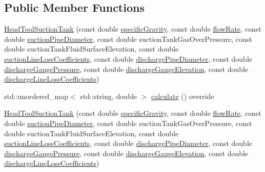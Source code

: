 \subsection*{Public Member Functions}
\begin{DoxyCompactItemize}
\item 
\hyperlink{class_head_tool_suction_tank_a96579ecd414c723362db00cfeb24cd46}{Head\+Tool\+Suction\+Tank} (const double \hyperlink{class_head_tool_base_ae5af2380fb5db2c25281ef663a5fb65f}{specific\+Gravity}, const double \hyperlink{class_head_tool_base_acf4c03cb62cbf63aba017ce063989fbc}{flow\+Rate}, const double \hyperlink{class_head_tool_base_a357365fc5ef346ce7bcb089c9d1a95e1}{suction\+Pipe\+Diameter}, const double suction\+Tank\+Gas\+Over\+Pressure, const double suction\+Tank\+Fluid\+Surface\+Elevation, const double \hyperlink{class_head_tool_base_ac74c6f6f8ab387efe7b77e0ce6ecd84e}{suction\+Line\+Loss\+Coefficients}, const double \hyperlink{class_head_tool_base_a126a397bd3d87b68864e1962c70bb45e}{discharge\+Pipe\+Diameter}, const double \hyperlink{class_head_tool_base_a39c854f13b16967e02a67cd1aaee07c4}{discharge\+Gauge\+Pressure}, const double \hyperlink{class_head_tool_base_a9ed2160992f8da2e335d919cf9aedd08}{discharge\+Gauge\+Elevation}, const double \hyperlink{class_head_tool_base_a147c035c7422406c594c5fd42ab11eb0}{discharge\+Line\+Loss\+Coefficients})
\item 
std\+::unordered\+\_\+map$<$ std\+::string, double $>$ \hyperlink{class_head_tool_suction_tank_a390a38466222aa3b87d2cf2ec84537a5}{calculate} () override
\item 
\hyperlink{class_head_tool_suction_tank_a96579ecd414c723362db00cfeb24cd46}{Head\+Tool\+Suction\+Tank} (const double \hyperlink{class_head_tool_base_ae5af2380fb5db2c25281ef663a5fb65f}{specific\+Gravity}, const double \hyperlink{class_head_tool_base_acf4c03cb62cbf63aba017ce063989fbc}{flow\+Rate}, const double \hyperlink{class_head_tool_base_a357365fc5ef346ce7bcb089c9d1a95e1}{suction\+Pipe\+Diameter}, const double suction\+Tank\+Gas\+Over\+Pressure, const double suction\+Tank\+Fluid\+Surface\+Elevation, const double \hyperlink{class_head_tool_base_ac74c6f6f8ab387efe7b77e0ce6ecd84e}{suction\+Line\+Loss\+Coefficients}, const double \hyperlink{class_head_tool_base_a126a397bd3d87b68864e1962c70bb45e}{discharge\+Pipe\+Diameter}, const double \hyperlink{class_head_tool_base_a39c854f13b16967e02a67cd1aaee07c4}{discharge\+Gauge\+Pressure}, const double \hyperlink{class_head_tool_base_a9ed2160992f8da2e335d919cf9aedd08}{discharge\+Gauge\+Elevation}, const double \hyperlink{class_head_tool_base_a147c035c7422406c594c5fd42ab11eb0}{discharge\+Line\+Loss\+Coefficients})

\end{DoxyCompactItemize}
